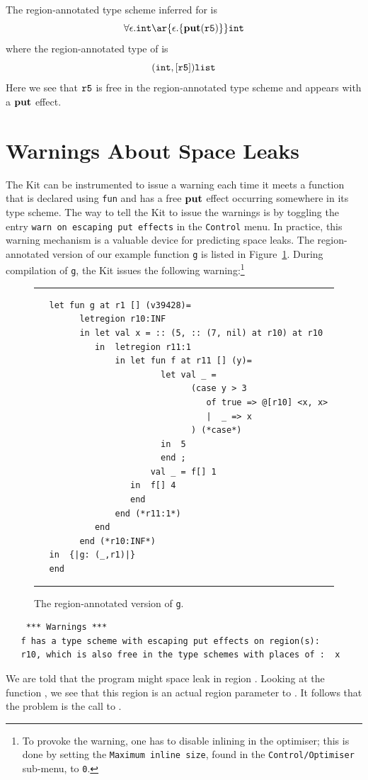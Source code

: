 \documentclass[12pt]{book}
\begin{document}
The region-annotated type scheme inferred for  is
$$\forall\epsilon.\boxml{int} \ar{\epsilon.\{\Put(\mathtt{r5})\}} \boxml{int}$$
where the region-annotated type of  is
$$(\hbox{\tt int},[\hbox{\tt r5}])\hbox{\tt list}$$
Here we see that
$\hbox{\tt r5}$ is free in the region-annotated type scheme and appears
with a $\mathop{\bf put}\nolimits$ effect.

\section{Warnings About Space Leaks}
The Kit can be instrumented to issue a warning each time it meets a
function that is declared using {\tt fun} and has a free $\mathop{\bf put}\nolimits$ effect
occurring somewhere in its type scheme. The way to tell the Kit to
issue the warnings is by toggling the entry 
%
{\tt warn on escaping put
  effects} in the {\tt Control} menu. In practice, this warning
mechanism is a valuable device for predicting space leaks.  The
region-annotated version of our example function {\tt g} is listed in
Figure~\ref{escape_mulexp.fig}. During compilation of {\tt g}, the Kit
issues the following warning:\footnote{To provoke the warning, one has
  to disable inlining in the
  {\Lam} optimiser; this is done by setting the {\tt Maximum inline
    size}, found in the {\tt Control/Optimiser} sub-menu, to {\tt 0}.}
\begin{figure}
\hrule
\medskip
\begin{verbatim}
   let fun g at r1 [] (v39428)= 
         letregion r10:INF 
         in let val x = :: (5, :: (7, nil) at r10) at r10
            in  letregion r11:1 
                in let fun f at r11 [] (y)= 
                         let val _ = 
                               (case y > 3 
                                  of true => @[r10] <x, x>
                                  |  _ => x
                               ) (*case*) 
                         in  5
                         end ; 
                       val _ = f[] 1
                   in  f[] 4
                   end  
                end (*r11:1*)
            end  
         end (*r10:INF*)
   in  {|g: (_,r1)|}
   end 
\end{verbatim}
\caption{The region-annotated version of {\tt g}.}
\medskip
\hrule
\label{escape_mulexp.fig}
\end{figure}

\begin{verbatim}
    *** Warnings ***
   f has a type scheme with escaping put effects on region(s): 
   r10, which is also free in the type schemes with places of :  x
\end{verbatim}
We are told that the program might space leak in region .
Looking at the function , we see that this region is an
actual region parameter to . It follows that the problem is
the call to .
\end{document}
